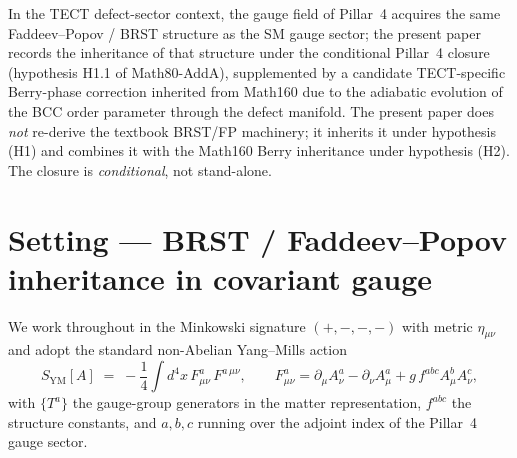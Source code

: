 In the TECT defect-sector context, the gauge field of Pillar~4
acquires the same Faddeev--Popov / BRST structure as the SM gauge
sector; the present paper records the inheritance of that structure
under the conditional Pillar~4 closure (hypothesis H1.1 of
Math80-AddA), supplemented by a candidate TECT-specific
Berry-phase correction inherited from Math160 due to the adiabatic
evolution of the BCC order parameter through the defect manifold.
The present paper does \emph{not} re-derive the textbook BRST/FP
machinery; it inherits it under hypothesis (H1) and combines it with
the Math160 Berry inheritance under hypothesis (H2). The closure is
\emph{conditional}, not stand-alone.

\section{Setting --- BRST / Faddeev--Popov inheritance in covariant
gauge}\label{sec:setting}

We work throughout in the Minkowski signature $(+,-,-,-)$ with
metric $\eta_{\mu\nu}$ and adopt the standard non-Abelian
Yang--Mills action
\begin{equation}\label{eq:SYM}
  S_{\mathrm{YM}}[A] \;=\;
  -\frac{1}{4}\int d^4x\, F^{a}_{\mu\nu}\,F^{a\,\mu\nu},
  \qquad
  F^{a}_{\mu\nu} = \partial_\mu A^{a}_\nu - \partial_\nu A^{a}_\mu
                 + g\,f^{abc} A^{b}_\mu A^{c}_\nu,
\end{equation}
with $\{T^a\}$ the gauge-group generators in the matter
representation, $f^{abc}$ the structure constants, and $a,b,c$
running over the adjoint index of the Pillar~4 gauge sector.

